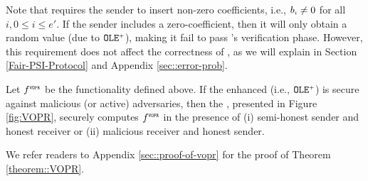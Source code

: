 \vspace{-6.3mm}


Note that \vopr requires the sender to insert non-zero coefficients, i.e., $b_{\scriptscriptstyle i}\neq 0$ for all $i,0 \leq i \leq e'$. If the sender includes a zero-coefficient, then it will only obtain a random value (due to  $\mathtt{OLE}^{\scriptscriptstyle +}$), making it fail to pass \vopr's verification phase. However, this requirement does not affect the correctness of \withFai, as we will explain in Section \ref{Fair-PSI-Protocol} and Appendix \ref{sec::error-prob}.  

\vspace{-2mm}



\begin{theorem}\label{theorem::VOPR}
%
Let $f^{\scriptscriptstyle \mathtt{VOPR}}$ be the functionality defined above. If the enhanced \ole (i.e., $\mathtt{OLE}^{\scriptscriptstyle +}$) is secure against malicious (or active) adversaries, then the  \vopr, presented in Figure \ref{fig:VOPR}, securely computes $f^{\scriptscriptstyle \mathtt{VOPR}}$ in the presence of (i) semi-honest sender and honest receiver or (ii) malicious receiver and honest sender. 
%
\end{theorem}

\vspace{-1mm}
We refer readers to Appendix \ref{sec::proof-of-vopr} for the proof of Theorem \ref{theorem::VOPR}. 
\vspace{-1mm}



%

